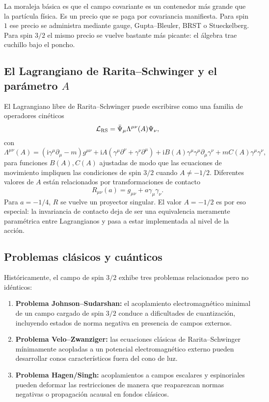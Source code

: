 \documentclass[11pt,a4paper]{article}
\numberwithin{equation}{section}
\newcommand{\Lcal}{\mathcal L}
\newcommand{\sdel}{\gamma^\mu\partial_\mu}
\newcommand{\ii}{\mathrm i}
\begin{document}
La moraleja básica es que el campo covariante es un contenedor más grande que la partícula física. Es un precio que se paga por covariancia manifiesta. Para spin $1$ ese precio se administra mediante gauge, Gupta--Bleuler, BRST o Stueckelberg. Para spin $3/2$ el mismo precio se vuelve bastante más picante: el álgebra trae cuchillo bajo el poncho.

\subsection{El Lagrangiano de Rarita--Schwinger y el parámetro \texorpdfstring{$A$}{A}}
\label{subsec:el-lagrangiano-de-rarita-schwinger-y-el-parametro-}

El Lagrangiano libre de Rarita--Schwinger puede escribirse como una familia de operadores cinéticos
\begin{equation}
\Lcal_{\rm RS}=\bar\Psi_\mu\Lambda^{\mu\nu}(A)\Psi_\nu,
\end{equation}
con
\begin{equation}
\Lambda^{\mu\nu}(A)
= (\ii\sdel-m)g^{\mu\nu}
+ \ii A(\gamma^\mu\partial^\nu+\gamma^\nu\partial^\mu)
+ \ii B(A)\gamma^\mu\sdel\gamma^\nu
+ m C(A)\gamma^\mu\gamma^\nu,
\end{equation}
para funciones $B(A),C(A)$ ajustadas de modo que las ecuaciones de movimiento impliquen las condiciones de spin $3/2$ cuando $A\neq-1/2$. Diferentes valores de $A$ están relacionados por transformaciones de contacto
\begin{equation}
R_{\mu\nu}(a)=g_{\mu\nu}+a\gamma_\mu\gamma_\nu.
\end{equation}
Para $a=-1/4$, $R$ se vuelve un proyector singular. El valor $A=-1/2$ es por eso especial: la invariancia de contacto deja de ser una equivalencia meramente paramétrica entre Lagrangianos y pasa a estar implementada al nivel de la acción.

\subsection{Problemas clásicos y cuánticos}
\label{subsec:problemas-clasicos-y-cuanticos}

Históricamente, el campo de spin $3/2$ exhibe tres problemas relacionados pero no idénticos:
\begin{enumerate}[label=(\alph*)]
\item \textbf{Problema Johnson--Sudarshan:} el acoplamiento electromagnético minimal de un campo cargado de spin $3/2$ conduce a dificultades de cuantización, incluyendo estados de norma negativa en presencia de campos externos.
\item \textbf{Problema Velo--Zwanziger:} las ecuaciones clásicas de Rarita--Schwinger mínimamente acopladas a un potencial electromagnético externo pueden desarrollar conos característicos fuera del cono de luz.
\item \textbf{Problema Hagen/Singh:} acoplamientos a campos escalares y espinoriales pueden deformar las restricciones de manera que reaparezcan normas negativas o propagación acausal en fondos clásicos.
\end{enumerate}
\end{document}
